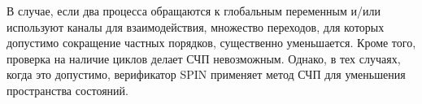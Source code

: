 В случае, если два процесса обращаются к глобальным переменным и/или
используют каналы для взаимодействия, множество переходов, для которых
допустимо сокращение частных порядков, существенно уменьшается. Кроме
того, проверка на наличие циклов делает СЧП невозможным. Однако, в тех
случаях, когда это допустимо, верификатор SPIN применяет метод СЧП для
уменьшения пространства состояний.


